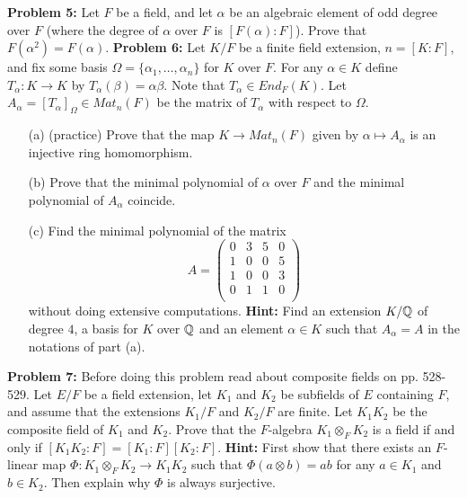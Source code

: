 \documentclass[12pt]{article}
\begin{document}
{\bf Problem 5:} \rm Let $F$ be a field, and let $\alpha$ be an algebraic element of odd degree
over $F$ (where the degree of $\alpha$ over $F$ is $[F(\alpha):F]$). Prove that
$F(\alpha^2)=F(\alpha)$.
\skv
\skv
{\bf Problem 6:} Let $K/F$ be a finite field extension, $n=[K:F]$, and fix some basis
$\Omega=\{\alpha_1,\ldots, \alpha_n\}$
for $K$ over $F$. For any $\alpha\in K$
define $T_{\alpha}:K\to K$ by $T_{\alpha}(\beta)=\alpha\beta$. Note that $T_{\alpha}\in  End_F(K)$.
Let $A_{\alpha}=[T_{\alpha}]_{\Omega}\in Mat_n(F)$ be the matrix of $T_{\alpha}$ with respect to $\Omega$.
\begin{itemize}


\item[(a)] (practice) Prove that the map $K\to Mat_n(F)$ given by $\alpha\mapsto A_{\alpha}$ is an injective ring homomorphism.
\item[(b)] Prove that the minimal polynomial of $\alpha$ over $F$ and the minimal polynomial of $A_{\alpha}$
coincide.

\item[(c)] Find the minimal polynomial of the matrix
$$A=\begin{pmatrix}  0&3& 5&0\\
1&0& 0&5\\
1&0& 0&3\\
0&1& 1&0\\
\end{pmatrix}$$
without doing extensive computations.
{\bf Hint:} Find an extension $K/{\mathbb Q}$ of degree $4$, a basis for $K$ over ${\mathbb Q}$
and an element $\alpha\in K$ such that $A_{\alpha}=A$ in the notations of part (a).
\end{itemize}


{\bf Problem 7:} Before doing this problem read about composite fields on pp. 528-529.
Let $E/F$ be a field extension, let $K_1$ and $K_2$ be subfields of $E$ containing $F$,
and assume that the extensions $K_1/F$ and $K_2/F$ are finite. Let $K_1 K_2$ be the composite
field of $K_1$ and $K_2$. Prove that the $F$-algebra $K_1\otimes_F K_2$ is a field if and only if
$[K_1 K_2: F]=[K_1: F][K_2: F]$. {\bf Hint:} First show that there exists an $F$-linear map
$\Phi: K_1\otimes_F K_2\to K_1 K_2$ such that $\Phi(a\otimes b)=ab$ for any $a\in K_1$ and $b\in K_2$.
Then explain why $\Phi$ is always surjective.
\end{document}
